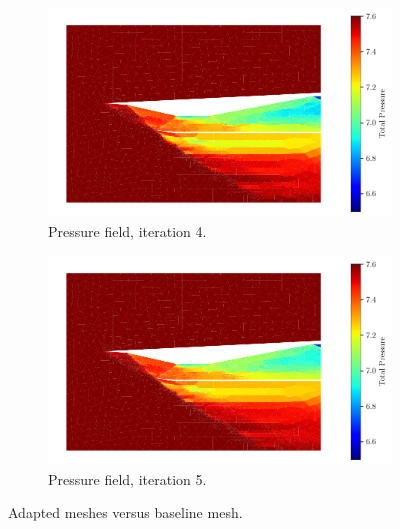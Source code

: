 \begin{figure}[h!]
    \begin{subfigure}[h]{0.49\linewidth}
        \centering
        \includegraphics[width=\linewidth]{rep/q4/Pfield4.pdf}
        \caption{Pressure field, iteration 4.}
    \end{subfigure}
    \begin{subfigure}[h]{0.49\linewidth}
        \centering
        \includegraphics[width=\linewidth]{rep/q4/Pfield5.pdf}
        \caption{Pressure field, iteration 5.}
    \end{subfigure}
    \caption[Adapted Meshes Versus Baseline Mesh]{Adapted meshes versus baseline mesh.}
    \label{fig:adapted_meshes}
\end{figure}



\pagebreak
